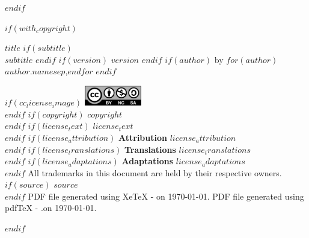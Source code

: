\documentclass[
    $if(fontsize)$$fontsize$$else$10pt$endif$,
    $if(papersize)$$papersize$$else$letterpaper$endif$,
    titlepage,
    oneside,
    openright,
    $if(is_draft)$draft$else$final$endif$,
    article]{memoir}
\begin{document}
$endif$



\frontmatter

%
%
$if(with_copyright)$
    \thispagestyle{empty}
    \begin{flushleft}
        {\bfseries $title$}
        $if(subtitle)$
            {\\\itshape $subtitle$}
        $endif$
        $if(version)$
            \normalsize {}\space $version$
        $endif$
        \hfill\newline
        $if(author)$
            \normalsize by
            $for(author)$\normalsize $author.name$$sep$,\space$endfor$
        $endif$
        \vspace*{1em}

        \vspace*{1.5em}
        $if(cc_license_image)$
            \includegraphics[keepaspectratio=true, width=2.5cm]
                {cc_by_nc_sa_40.eps}\\[1.2em]
        $endif$
        \justify
        $if(copyright)$
            \normalsize $copyright$\\[1.2em]
        $endif$
        $if(license_text)$
            \normalsize $license_text$\\[1.2em]
        $endif$
        $if(license_attribution)$
            \normalsize {\bfseries Attribution}\textemdash%
                 $license_attribution$\\[1.2em]
        $endif$
        $if(license_translations)$
            \normalsize {\bfseries Translations}\textemdash%
                $license_translations$\\[1.2em]
        $endif$
        $if(license_adaptations)$
            \normalsize {\bfseries Adaptations}\textemdash%
                $license_adaptations$\\[1.2em]
        $endif$
        \normalsize All trademarks in this document are held by their %
            respective owners.\\[1.2em]
        $if(source)$
            \normalsize $source$\\[1.2em]
        $endif$
        \ifxetex
            \normalsize PDF file generated using XeTeX %
                \the\eTeXversion\eTeXrevision-%
                \the\XeTeXversion\XeTeXrevision\space on \today.
        \else
            \normalsize PDF file generated using pdfTeX %
                \the\eTeXversion\eTeXrevision-%
                \the\pdftexversion.\pdftexrevision\space on \today.
        \fi
    \end{flushleft}
    \pagebreak
    \cleardoublepage
$endif$
\end{document}
